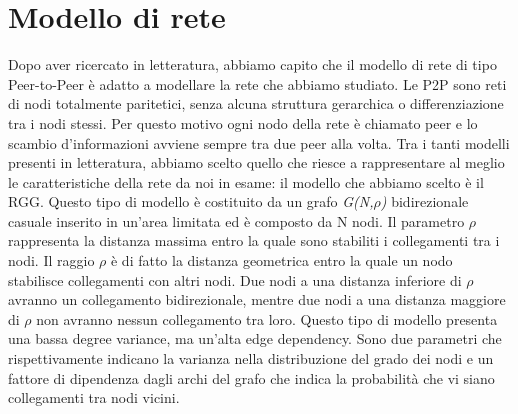 \section{Modello di rete}
Dopo aver ricercato in letteratura, abbiamo capito che il modello di rete di tipo Peer-to-Peer è adatto a modellare la rete che abbiamo studiato. Le \acs{P2P} sono reti di nodi totalmente paritetici, senza alcuna struttura gerarchica o differenziazione tra i nodi stessi. Per questo motivo ogni nodo della rete è chiamato peer e lo scambio d'informazioni avviene sempre tra due peer alla volta. Tra i tanti modelli presenti in letteratura, abbiamo scelto quello che riesce a rappresentare al meglio le caratteristiche della rete da noi in esame: il modello che abbiamo scelto è il \acf{RGG}. Questo tipo di modello è costituito da un grafo \textit{G(N,$\rho$)} bidirezionale casuale inserito in un'area limitata ed è composto da N nodi. Il parametro $\rho$ rappresenta la distanza massima entro la quale sono stabiliti i collegamenti tra i nodi. Il raggio $\rho$ è di fatto la distanza geometrica entro la quale un nodo stabilisce collegamenti con altri nodi. Due nodi a una distanza inferiore di $\rho$ avranno un collegamento bidirezionale, mentre due nodi a una distanza maggiore di $\rho$ non avranno nessun collegamento tra loro. Questo tipo di modello presenta una bassa degree variance, ma un'alta edge dependency. Sono due parametri che rispettivamente indicano la varianza nella distribuzione del grado dei nodi e un fattore di dipendenza dagli archi del grafo che indica la probabilità che vi siano collegamenti tra nodi vicini.

